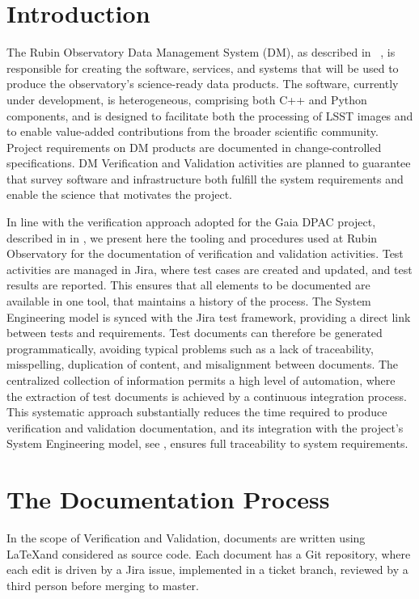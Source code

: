 \section{Introduction}

The Rubin Observatory Data Management System (DM), as described in~\cite{2015arXiv151207914J} ,
is responsible for creating the software, services, and systems that will be used to
produce the observatory's science-ready data products. The software, currently under development, is heterogeneous,
comprising both C++ and Python components, and is designed to facilitate both the processing of LSST images
and to enable value-added contributions from the broader scientific community. Project requirements on DM
products are documented in change-controlled specifications. DM Verification and Validation activities are planned
to guarantee that survey software and infrastructure both fulfill the system requirements and enable the science that
motivates the project.

In line with the verification approach adopted for the Gaia DPAC project, described in in \cite{10.1117/12.926797} , 
we present here the tooling and procedures used at Rubin Observatory for the documentation of verification and
validation activities. Test activities are managed in Jira, where test cases are created and updated, and test results
are reported. This ensures that all elements to be documented are available in one tool, that maintains a history of
the process. The System Engineering model is synced with the Jira test framework, providing a direct link between
tests and requirements. Test documents can therefore be generated programmatically, avoiding typical problems
such as a lack of traceability, misspelling, duplication of content, and misalignment between documents. The
centralized collection of information permits a high level of automation, where the extraction of test documents is
achieved by a continuous integration process. This systematic approach substantially reduces the time required to
produce verification and validation documentation, and its integration with the project's System Engineering model, 
see \cite{10.1117/12.2310125} , ensures full traceability to system requirements.


\section{The Documentation Process}

In the scope of Verification and Validation, documents are written using \LaTeX and considered as source code.
Each document has a Git repository, where each edit is driven by a Jira issue, implemented in a ticket branch, 
reviewed by a third person before merging to master.

